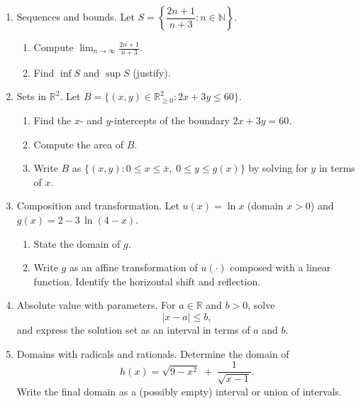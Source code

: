\documentclass[12pt]{article}
\newcommand{\R}{\mathbb{R}}
\begin{document}
\begin{enumerate}
\item Sequences and bounds. Let $S=\left\{\dfrac{2n+1}{n+3}: n\in\mathbb{N}\right\}$.
\begin{enumerate}[label=(\alph*)]
  \item Compute $\displaystyle \lim_{n\to\infty} \frac{2n+1}{n+3}$.
  \item Find $\inf S$ and $\sup S$ (justify).
\end{enumerate}

\item Sets in $\R^2$. Let $B=\{(x,y)\in\R_{\ge 0}^2: 2x+3y\le 60\}$.
\begin{enumerate}[label=(\alph*)]
  \item Find the $x$- and $y$-intercepts of the boundary $2x+3y=60$.
  \item Compute the area of $B$.
  \item Write $B$ as $\{(x,y): 0\le x\le \bar x,\; 0\le y\le g(x)\}$ by solving for $y$ in terms of $x$.
\end{enumerate}

\item Composition and transformation. Let $u(x)=\ln x$ (domain $x>0$) and $g(x)=2-3\,\ln(4-x)$.
\begin{enumerate}[label=(\alph*)]
  \item State the domain of $g$.
  \item Write $g$ as an affine transformation of $u\!\left(\cdot\right)$ composed with a linear function. Identify the horizontal shift and reflection.
\end{enumerate}

\item Absolute value with parameters. For $a\in\R$ and $b>0$, solve
\[
\lvert x-a\rvert \le b,
\]
and express the solution set as an interval in terms of $a$ and $b$.

\item Domains with radicals and rationals. Determine the domain of
\[
h(x)=\sqrt{9-x^2}\;+\;\frac{1}{\sqrt{x-1}}.
\]
Write the final domain as a (possibly empty) interval or union of intervals.
\end{enumerate}
\end{document}
